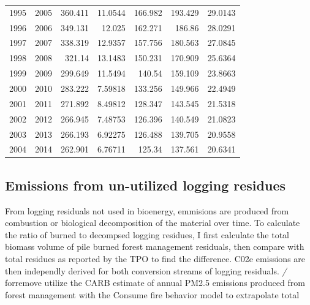 \documentclass[a4paper]{article}
\begin{document}
\begin{longtable}{rrrrrrr}
1995 & 2005 & 360.411 & 11.0544 & 166.982 & 193.429 & 29.0143\\
1996 & 2006 & 349.131 & 12.025 & 162.271 & 186.86 & 28.0291\\
1997 & 2007 & 338.319 & 12.9357 & 157.756 & 180.563 & 27.0845\\
1998 & 2008 & 321.14 & 13.1483 & 150.231 & 170.909 & 25.6364\\
1999 & 2009 & 299.649 & 11.5494 & 140.54 & 159.109 & 23.8663\\
2000 & 2010 & 283.222 & 7.59818 & 133.256 & 149.966 & 22.4949\\
2001 & 2011 & 271.892 & 8.49812 & 128.347 & 143.545 & 21.5318\\
2002 & 2012 & 266.945 & 7.48753 & 126.396 & 140.549 & 21.0823\\
2003 & 2013 & 266.193 & 6.92275 & 126.488 & 139.705 & 20.9558\\
2004 & 2014 & 262.901 & 6.76711 & 125.34 & 137.561 & 20.6341\\
\end{longtable}

\subsection{Emissions from un-utilized logging residues}
\label{sec-3-2}

From logging residuals not used in bioenergy, emmisions are produced
from combustion or biological decomposition of the
material over time. To calculate the ratio of burned to decompsed
logging residues, I first calculate the total biomass volume of pile burned forest management residuals, then compare with total residues as reported by the TPO to find the difference. C02e emissions are then independly derived for both conversion streams of logging residuals. \emph{/} forremove  utilize the CARB estimate of annual PM2.5 emissions produced from
forest management with the Consume fire behavior model to extrapolate total 
\end{document}
